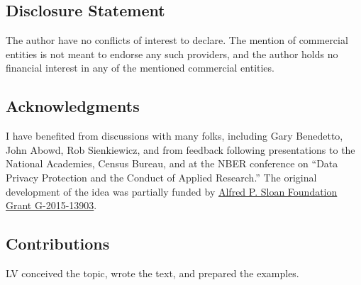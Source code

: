 \documentclass[]{hdsr}
\begin{document}
\subsection*{Disclosure Statement}
The author have no conflicts of interest to declare. The mention of commercial entities is not meant to endorse any such providers, and the author holds no financial interest in any of the mentioned commercial entities.

\subsection*{Acknowledgments}

I have benefited from discussions with many folks, including Gary Benedetto, John Abowd, Rob Sienkiewicz, and from feedback following presentations to the National Academies, Census Bureau, and at the NBER conference on ``Data Privacy Protection and the Conduct of Applied Research.'' The original development of the idea was partially funded by \href{https://sloan.org/grant-detail/6845}{Alfred P. Sloan Foundation Grant G-2015-13903}.

\subsection*{Contributions}

LV conceived the topic, wrote the text, and prepared the examples.


\appendix




\printbibliography
\end{document}
